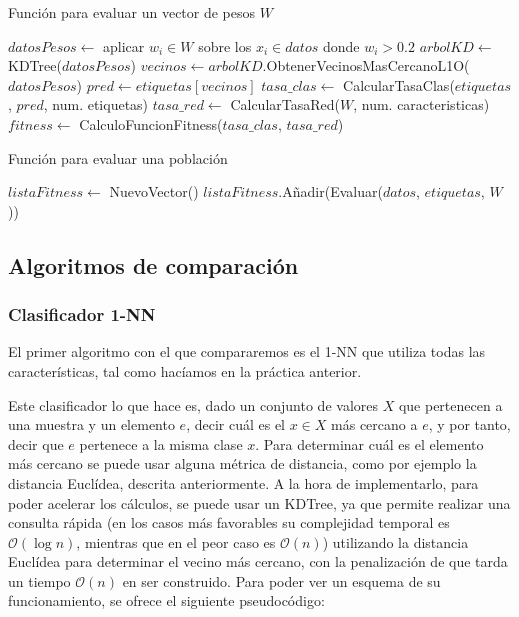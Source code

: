 \documentclass[11pt,a4paper]{article}
\begin{document}
\begin{algorithm}[H]
\caption{Función para evaluar un vector de pesos $W$}
\begin{algorithmic}[1]
\State $datosPesos \gets$ aplicar $w_i \in W$ sobre los $x_i \in datos$ donde $w_i > 0.2$
\State $arbolKD \gets$ KDTree($datosPesos$)
\State $vecinos \gets arbolKD$.ObtenerVecinosMasCercanoL1O($datosPesos$)
\State $pred \gets etiquetas[vecinos]$
\State $tasa\_clas \gets$ CalcularTasaClas($etiquetas$, $pred$, num. etiquetas)
\State $tasa\_red \gets$ CalcularTasaRed($W$, num. caracteristicas)
\State $fitness \gets$ CalculoFuncionFitness($tasa\_clas$, $tasa\_red$)
\State {}
\EndFunction
\end{algorithmic}
\end{algorithm}

\begin{algorithm}[H]
\caption{Función para evaluar una población}
\begin{algorithmic}[1]
\State $listaFitness \gets $ NuevoVector()
	\State $listaFitness$.Añadir(Evaluar($datos$, $etiquetas$, $W$))
\EndFor
\State {}
\EndFunction
\end{algorithmic}
\end{algorithm}

\newpage

\subsection{Algoritmos de comparación}

\subsubsection{Clasificador 1-NN}

El primer algoritmo con el que compararemos es el 1-NN que utiliza todas las características, tal como hacíamos en la 
práctica anterior.

Este clasificador lo que hace es, dado un conjunto de valores $X$ que pertenecen a una muestra y un elemento $e$, decir cuál es el
$x \in X$ más cercano a $e$, y por tanto, decir que $e$ pertenece a la misma clase $x$. Para determinar cuál es el elemento más
cercano se puede usar alguna métrica de distancia, como por ejemplo la distancia Euclídea, descrita anteriormente. A la hora de
implementarlo, para poder acelerar los cálculos, se puede usar un KDTree, ya que permite realizar una consulta rápida (en los
casos más favorables su complejidad temporal es $\mathcal{O} (\log n)$, mientras que en el peor caso es $\mathcal{O}(n)$)
utilizando la distancia Euclídea para determinar el vecino más cercano, con la penalización de que tarda un tiempo
$\mathcal{O}(n)$ en ser construido. Para poder ver un esquema de su funcionamiento, se ofrece el siguiente pseudocódigo:
\end{document}
